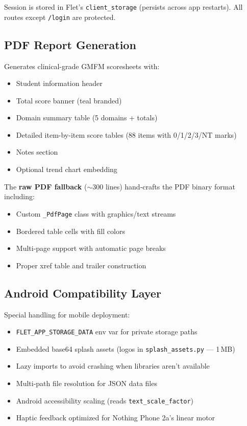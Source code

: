 \documentclass[12pt,a4paper]{article}
\begin{document}
Session is stored in Flet's \texttt{client\_storage} (persists across app restarts). All routes except \texttt{/login} are protected.

\subsection{PDF Report Generation}

Generates clinical-grade GMFM scoresheets with:

\begin{itemize}[leftmargin=2em]
    \item Student information header
    \item Total score banner (teal branded)
    \item Domain summary table (5 domains + totals)
    \item Detailed item-by-item score tables (88 items with 0/1/2/3/NT marks)
    \item Notes section
    \item Optional trend chart embedding
\end{itemize}

The \textbf{raw PDF fallback} ($\sim$300 lines) hand-crafts the PDF binary format including:

\begin{itemize}[leftmargin=2em]
    \item Custom \texttt{\_PdfPage} class with graphics/text streams
    \item Bordered table cells with fill colors
    \item Multi-page support with automatic page breaks
    \item Proper xref table and trailer construction
\end{itemize}

\subsection{Android Compatibility Layer}

Special handling for mobile deployment:

\begin{itemize}[leftmargin=2em]
    \item \texttt{FLET\_APP\_STORAGE\_DATA} env var for private storage paths
    \item Embedded base64 splash assets (logos in \texttt{splash\_assets.py} --- 1\,MB)
    \item Lazy imports to avoid crashing when libraries aren't available
    \item Multi-path file resolution for JSON data files
    \item Android accessibility scaling (reads \texttt{text\_scale\_factor})
    \item Haptic feedback optimized for Nothing Phone 2a's linear motor
\end{itemize}
\end{document}
